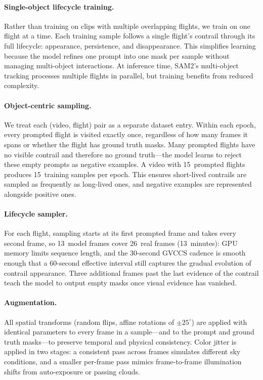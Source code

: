 \documentclass[1p,11pt]{elsarticle}
\begin{document}
\paragraph{Single-object lifecycle training.} Rather than training on clips with multiple overlapping flights, we train on one flight at a time. Each training sample follows a single flight's contrail through its full lifecycle: appearance, persistence, and disappearance. This simplifies learning because the model refines one prompt into one mask per sample without managing multi-object interactions. At inference time, SAM2's multi-object tracking processes multiple flights in parallel, but training benefits from reduced complexity. 

\paragraph{Object-centric sampling.} We treat each (video, flight) pair as a separate dataset entry. Within each epoch, every prompted flight is visited exactly once, regardless of how many frames it spans or whether the flight has ground truth masks. Many prompted flights have no visible contrail and therefore no ground truth---the model learns to reject these empty prompts as negative examples. A video with 15~prompted flights produces 15~training samples per epoch. This ensures short-lived contrails are sampled as frequently as long-lived ones, and negative examples are represented alongside positive ones.

\paragraph{Lifecycle sampler.} For each flight, sampling starts at its first prompted frame and takes every second frame, so 13~model frames cover 26~real frames (13~minutes): GPU memory limits sequence length, and the 30-second GVCCS cadence is smooth enough that a 60-second effective interval still captures the gradual evolution of contrail appearance. Three additional frames past the last evidence of the contrail teach the model to output empty masks once visual evidence has vanished.

\paragraph{Augmentation.} All spatial transforms (random flips, affine rotations of $\pm 25^{\circ}$) are applied with identical parameters to every frame in a sample---and to the prompt and ground truth masks---to preserve temporal and physical consistency. Color jitter is applied in two stages: a consistent pass across frames simulates different sky conditions, and a smaller per-frame pass mimics frame-to-frame illumination shifts from auto-exposure or passing clouds.
\end{document}

